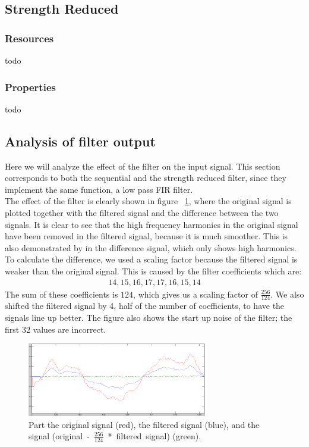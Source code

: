 \subsection{Strength Reduced}
\subsubsection{Resources}
todo
\subsubsection{Properties}
todo
\subsection{Analysis of filter output}
Here we will analyze the effect of the filter on the input signal. This section corresponds to both the sequential and the strength reduced filter, since they implement the same function, a low pass FIR filter.\\
The effect of the filter is clearly shown in figure  ~\ref{fig:diff}, where the original signal is plotted together with the filtered signal and the difference between the two signals. It is clear to see that the high frequency harmonics in the original signal have been removed in the filtered signal, because it is much smoother. This is also demonstrated by in the difference signal, which only shows high harmonics. To calculate the difference, we used a scaling factor because the filtered signal is weaker than the original signal. This is caused by the filter coefficients which are:
\begin{gather*}
14,15,16,17,17,16,15,14
\end{gather*}
The sum of these coefficients is $124$, which gives us a scaling factor of $\frac{256}{124}$. We also shifted the filtered signal by 4, half of the number of coefficients, to have the signals line up better. The figure also shows the start up noise of the filter; the first 32 values are incorrect.

\begin{figure}
\begin{center}
\includegraphics[width=0.7\textwidth]{images/diff.png}
\caption{Part the original signal (red), the filtered signal (blue), and the signal \mbox{(original - $\frac{256}{124}$ * filtered signal)} (green).}
\label{fig:diff}
\end{center}
\end{figure}

